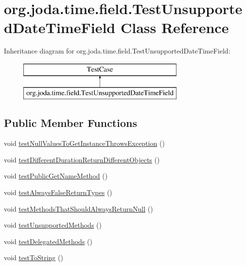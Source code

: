 \hypertarget{classorg_1_1joda_1_1time_1_1field_1_1_test_unsupported_date_time_field}{\section{org.\-joda.\-time.\-field.\-Test\-Unsupported\-Date\-Time\-Field Class Reference}
\label{classorg_1_1joda_1_1time_1_1field_1_1_test_unsupported_date_time_field}
}
Inheritance diagram for org.\-joda.\-time.\-field.\-Test\-Unsupported\-Date\-Time\-Field\-:\begin{figure}[H]
\begin{center}
\leavevmode
\includegraphics[height=2.000000cm]{classorg_1_1joda_1_1time_1_1field_1_1_test_unsupported_date_time_field}
\end{center}
\end{figure}
\subsection*{Public Member Functions}
\begin{DoxyCompactItemize}
\item 
void \hyperlink{classorg_1_1joda_1_1time_1_1field_1_1_test_unsupported_date_time_field_a6a9d67d97178ffa27182af9d7afbbf5f}{test\-Null\-Values\-To\-Get\-Instance\-Throws\-Exception} ()
\item 
void \hyperlink{classorg_1_1joda_1_1time_1_1field_1_1_test_unsupported_date_time_field_a6165e50b955689c3e610b3de359d8afa}{test\-Different\-Duration\-Return\-Different\-Objects} ()
\item 
void \hyperlink{classorg_1_1joda_1_1time_1_1field_1_1_test_unsupported_date_time_field_ab10fb480727c8c278af3b11deec9fe60}{test\-Public\-Get\-Name\-Method} ()
\item 
void \hyperlink{classorg_1_1joda_1_1time_1_1field_1_1_test_unsupported_date_time_field_a56db51554d67f91ad3d997cc674ea13b}{test\-Always\-False\-Return\-Types} ()
\item 
void \hyperlink{classorg_1_1joda_1_1time_1_1field_1_1_test_unsupported_date_time_field_a77a4d4f62f83b1d823e839106bba96a4}{test\-Methods\-That\-Should\-Always\-Return\-Null} ()
\item 
void \hyperlink{classorg_1_1joda_1_1time_1_1field_1_1_test_unsupported_date_time_field_a886fc074538bff84c2dcfa9930b3b78e}{test\-Unsupported\-Methods} ()
\item 
void \hyperlink{classorg_1_1joda_1_1time_1_1field_1_1_test_unsupported_date_time_field_a6edb7e3708f071d51d917f95de999883}{test\-Delegated\-Methods} ()
\item 
void \hyperlink{classorg_1_1joda_1_1time_1_1field_1_1_test_unsupported_date_time_field_a444bb9690eb6e4163812395a4b1e6535}{test\-To\-String} ()
\end{DoxyCompactItemize}
